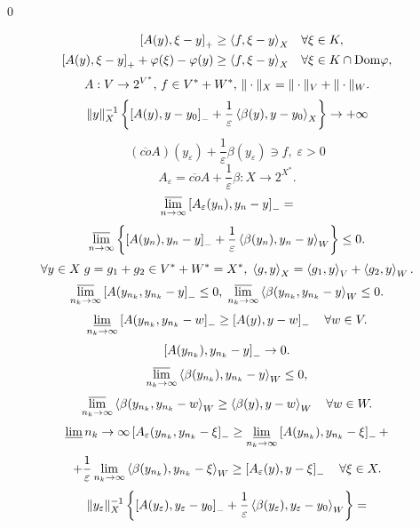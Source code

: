 \documentclass[12pt]{book} %
\title{}
\author{}
\newcommand{\Dom}{\mbox{Dom}}
\let\epsilon\varepsilon
\begin{document}
\setcounter{chapter}{2}
\chapter{}
\begin{center}\qed\end{center}
\setcounter{equation}{7}
\begin{align}
	\mysbra{A(y),\xi-y}_+\geq\mysca{f}{\xi-y}_X &\quad\forall\xi\in K,\\
	\mysbra{A(y),\xi-y}_++\phi(\xi)-\phi(y)\geq\mysca{f}{\xi-y}_X &\quad\forall\xi\in K\cap\Dom\phi,
\end{align}
\[A:V\to2^{V^*},\,f\in V^*+W^*,\,\|\cdot\|_X=\|\cdot\|_V+\|\cdot\|_W.\]
\begin{equation}\mynorm{y}_X^{-1}\mycbra{\mysbra{A(y),y-y_0}_-+\frac{1}{\epsilon}\mysca{\beta(y)}{y-y_0}_X}\to+\infty\end{equation}
\begin{equation}(\overline{co}A)(y_\epsilon)+\frac{1}{\epsilon}\beta(y_\epsilon)\ni f,\;\epsilon>0\end{equation}
\[A_\epsilon=\overline{co}A+\frac{1}{\epsilon}\beta:X\to2^{X^*}.\]
\[\varlimsup_{n\to\infty}\mysbra{A_\epsilon(y_n),y_n-y}_-=\]
\[\varlimsup_{n\to\infty}\mycbra{\mysbra{A(y_n),y_n-y}_-+\frac{1}{\epsilon}\mysca{\beta(y_n)}{y_n-y}_W}\leq0.\]
\[\forall y\in X\;g=g_1+g_2\in V^*+W^*=X^*,\;\left<g,y\right>_X=\left<g_1,y\right>_V+\left<g_2,y\right>_W.\]
\begin{equation}\varlimsup_{n_k\to\infty}\left[A(y_{n_k},y_{n_k}-y\right]_-\leq0,\;\varlimsup_{n_k\to\infty}\left<\beta(y_{n_k},y_{n_k}-y\right>_W\leq0.
\end{equation}
\begin{equation}\varliminf_{n_k\to\infty}\left[A(y_{n_k},y_{n_k}-w\right]_-\geq\left[A(y),y-w\right]_-\quad\forall w\in V.\end{equation}
	\[\left[A(y_{n_k}),y_{n_k}-y\right]_-\to0.\]
	\[\varlimsup_{n_k\to\infty}\left<\beta(y_{n_k}),y_{n_k}-y\right>_W\leq0,\]
	\begin{equation}\varlimsup_{n_k\to\infty}\left<\beta(y_{n_k},y_{n_k}-w\right>_W\geq\left<\beta(y),y-w\right>_W\quad\forall w\in W.\end{equation}
\newcommand{\nk}{n_k}
\newcommand{\yk}{y_{n_k}}
\[\varliminf{n_k\to\infty}\mysbra{A_\epsilon(\yk,\yk-\xi}_-\geq\varliminf_{\nk\to\infty}\mysbra{A(\yk),\yk-\xi}_-+\]
\[+\frac{1}{\epsilon}\lim_{\nk\to\infty}\mysca{\beta(\yk)}{\yk-\xi}_W\geq\mysbra{A_\epsilon(y),y-\xi}_-\quad\forall\xi\in X.\]
\[\mynorm{y_\epsilon}_X^{-1}\mycbra{\mysbra{A(y_\epsilon),y_\epsilon-y_0}_-+\frac{1}{\epsilon}\mysca{\beta(y_\epsilon)}{y_\epsilon-y_0}_W}=\]
\end{document}

